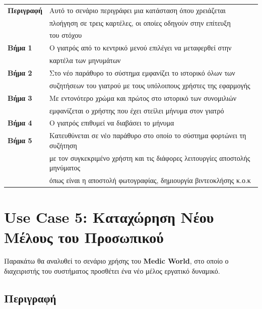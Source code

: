 \documentclass{article}
\newcommand\T{\rule{0pt}{2.6ex}}       %
\newcommand\B{\rule[-1.2ex]{0pt}{0pt}}
\begin{document}
 \begin{center}
     \begin{tabular}{|l|l|}
     \hline
      \textbf{Περιγραφή} & Αυτό το σενάριο περιγράφει μια κατάσταση όπου χρειάζεται \T \\& πλοήγηση σε τρεις καρτέλες, οι οποίες οδηγούν στην επίτευξη \\& του στόχου \B \\ 
      \hline
      \textbf{Βήμα 1} & Ο γιατρός από το κεντρικό μενού επιλέγει να μεταφερθεί στην \T \\& καρτέλα των μηνυμάτων \B \\
      \hline
      \textbf{Βήμα 2} & Στο νέο παράθυρο το σύστημα εμφανίζει το ιστορικό όλων των \T \\& συζητήσεων του γιατρού με τους υπόλοιπους χρήστες της εφαρμογής \B \\
      \hline
      \textbf{Βήμα 3} & Με εντονότερο χρώμα και πρώτος στο ιστορικό των συνομιλιών \T \\& εμφανίζεται ο χρήστης που έχει στείλει μήνυμα στον γιατρό \B \\
      \hline
      \textbf{Βήμα 4} & Ο γιατρός επιθυμεί να διαβάσει το μήνυμα \T\B \\
      \hline
      \textbf{Βήμα 5} & Κατευθύνεται σε νέο παράθυρο στο οποίο το σύστημα φορτώνει τη συζήτηση \T \\& με τον συγκεκριμένο χρήστη και τις διάφορες λειτουργίες αποστολής μηνύματος \\& όπως είναι η αποστολή φωτογραφίας, δημιουργία βιντεοκλήσης κ.ο.κ \B \\
      \hline
     \end{tabular}
 \end{center}
 
 
 \newpage
 
 \section{Use Case 5: Καταχώρηση Νέου Μέλους του Προσωπικού}

Παρακάτω θα αναλυθεί το σενάριο χρήσης του \textbf{Medic World}, στο οποίο ο διαχειριστής του συστήματος προσθέτει ένα νέο μέλος εργατικό δυναμικό.

\subsection{Περιγραφή}
\end{document}
